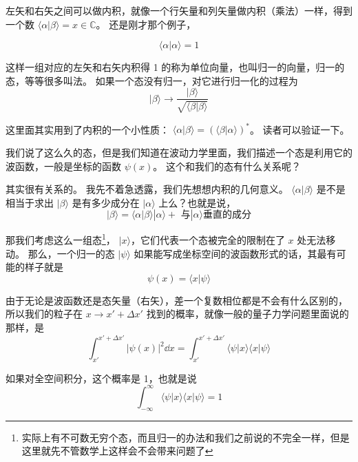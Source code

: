 左矢和右矢之间可以做内积，就像一个行矢量和列矢量做内积（乘法）一样，得到一个数 $\langle\alpha|\beta\rangle = x \in \mathbb{C}$。 还是刚才那个例子，

\begin{example}{}
\begin{equation}
\langle\alpha|\alpha\rangle = 1
\end{equation}
\end{example}

这样一组对应的左矢和右矢内积得 1 的称为单位向量，也叫归一的向量，归一的态，等等很多叫法。 如果一个态没有归一，对它进行归一化的过程为
\begin{equation}
|\beta\rangle\rightarrow\frac{|\beta\rangle}{\sqrt{\langle\beta|\beta\rangle}}
\end{equation}

这里面其实用到了内积的一个小性质： $\langle\alpha|\beta\rangle = (\langle\beta|\alpha\rangle)^*$。 读者可以验证一下。

我们说了这么久的态，但是我们知道在波动力学里面，我们描述一个态是利用它的波函数，一般是坐标的函数 $\psi(x)$。 这个和我们的态有什么关系呢？

其实很有关系的。 我先不着急透露，我们先想想内积的几何意义。 $\langle\alpha|\beta\rangle$ 是不是相当于求出 $|\beta\rangle$ 是有多少成分在 $|\alpha\rangle$ 上么？也就是说，
\begin{equation}
|\beta\rangle = \langle\alpha|\beta\rangle|\alpha\rangle + \text{ 与}|\alpha\rangle\text{垂直的成分} 
\end{equation}

那我们考虑这么一组态\footnote{实际上有不可数无穷个态，而且归一的办法和我们之前说的不完全一样，但是这里就先不管数学上这样会不会带来问题了}， $|x\rangle$，它们代表一个态被完全的限制在了 $x$ 处无法移动。 那么，一个归一的态 $|\psi\rangle$ 如果能写成坐标空间的波函数形式的话，其最有可能的样子就是
\begin{equation}
\psi(x) = \langle x|\psi\rangle
\end{equation}

由于无论是波函数还是态矢量（右矢），差一个复数相位都是不会有什么区别的，所以我们的粒子在 $x\rightarrow x'+\Delta x'$ 找到的概率，就像一般的量子力学问题里面说的那样，是
\begin{equation}
\int_{x'}^{x'+\Delta x'}|\psi(x)|^2 \dd{x} = \int_{x'}^{x'+\Delta x'} \langle\psi|x\rangle\langle x|\psi\rangle
\end{equation}

如果对全空间积分，这个概率是 1，也就是说
\begin{equation}
\int_{-\infty}^{\infty}\langle\psi|x\rangle\langle x|\psi\rangle = 1
\end{equation}

